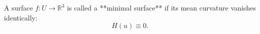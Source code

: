 A surface $f: U \to \mathbb{R}^3$ is called a **minimal surface** if its mean curvature vanishes identically:
$$H(u) \equiv 0.$$
